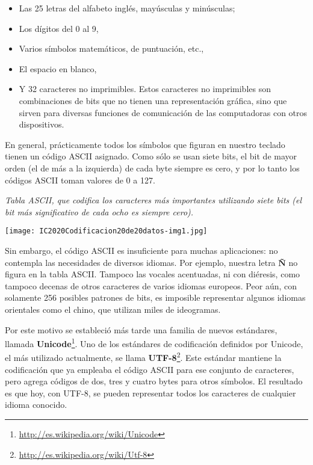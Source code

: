 \documentclass[a4paper]{article}
\newcommand\liststyleLi{%
\renewcommand\labelitemi{{\textbullet}}
\renewcommand\labelitemii{${\circ}$}
\renewcommand\labelitemiii{${\blacksquare}$}
\renewcommand\labelitemiv{{\textbullet}}
}
\begin{document}
\liststyleLi
\begin{itemize}
\item Las 25 letras del alfabeto ingl\'es, may\'usculas y min\'usculas; 
\item Los d\'igitos del 0 al 9, 
\item Varios s\'imbolos matem\'aticos, de puntuaci\'on, etc., 
\item El espacio en blanco, 
\item Y 32 caracteres no imprimibles. Estos caracteres no imprimibles
son combinaciones de bits que no tienen una representaci\'on gr\'afica,
sino que sirven para diversas funciones de comunicaci\'on de las
computadoras con otros dispositivos. 
\end{itemize}
En general, pr\'acticamente todos los s\'imbolos que figuran en nuestro
teclado tienen un c\'odigo ASCII asignado. Como s\'olo se usan siete
bits, el bit de mayor orden (el de m\'as a la izquierda) de cada byte
siempre es cero, y por lo tanto los c\'odigos ASCII toman valores de 0
a 127.



\begin{center}
\begin{minipage}{17cm}
{\centering\itshape
Tabla ASCII, que codifica los caracteres m\'as importantes
utilizando\newline
siete bits (el bit m\'as significativo de cada ocho es siempre cero).
\par}
\texttt{[image: IC2020Codificacion20de20datos-img1.jpg]}\end{minipage}
\end{center}
Sin embargo, el c\'odigo ASCII es insuficiente para muchas aplicaciones:
no contempla las necesidades de diversos idiomas. Por ejemplo, nuestra
letra \textbf{\~N} no figura en la tabla ASCII. Tampoco las vocales
acentuadas, ni con di\'eresis, como tampoco decenas de otros caracteres
de varios idiomas europeos. Peor a\'un, con solamente 256 posibles
patrones de bits, es imposible representar algunos idiomas orientales
como el chino, que utilizan miles de ideogramas.

Por este motivo se estableci\'o m\'as tarde una familia de nuevos
est\'andares, llamada
\textbf{Unicode}\footnote{\url{http://es.wikipedia.org/wiki/Unicode}}.
Uno de los est\'andares de codificaci\'on definidos por Unicode, el
m\'as utilizado actualmente, se llama
\textbf{UTF-8}\footnote{\url{http://es.wikipedia.org/wiki/Utf-8}}. Este
est\'andar mantiene la codificaci\'on que ya empleaba el c\'odigo ASCII
para ese conjunto de caracteres, pero agrega c\'odigos de dos, tres y
cuatro bytes para otros s\'imbolos. El resultado es que hoy, con UTF-8,
se pueden representar todos los caracteres de cualquier idioma
conocido.
\end{document}
